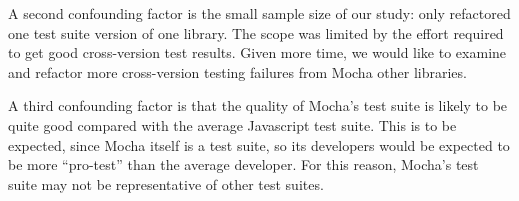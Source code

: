 A second confounding factor is the small sample size of our study:
only refactored one test suite version of one library. The scope was
limited by the effort required to get good cross-version test
results. Given more time, we would like to examine and refactor more
cross-version testing failures from Mocha other libraries.

A third confounding factor is that the quality of Mocha's test suite
is likely to be quite good compared with the average Javascript test
suite. This is to be expected, since Mocha itself is a test suite, so
its developers would be expected to be more ``pro-test'' than the
average developer. For this reason, Mocha's test suite may not be
representative of other test suites.


